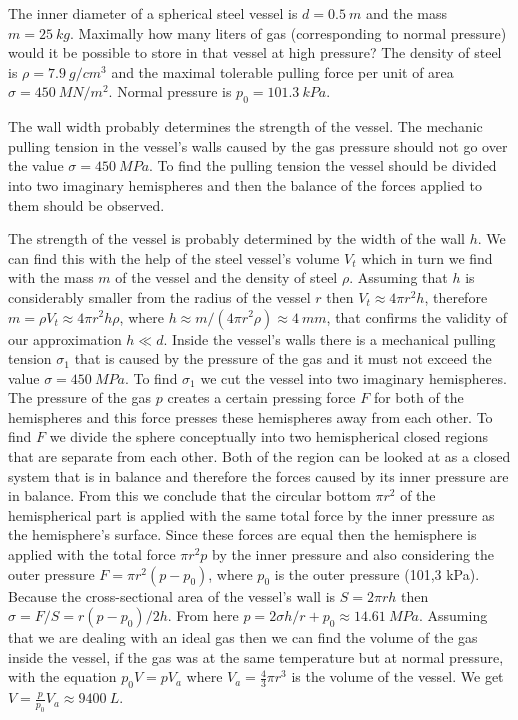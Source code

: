 {\ifEngStatement
The inner diameter of a spherical steel vessel is $d=\SI{0.5}{m}$ and the mass $m=\SI{25}{kg}$. Maximally how many liters of gas (corresponding to normal pressure) would it be possible to store in that vessel at high pressure? The density of steel is $\rho=\SI{7.9}{g/cm^3}$ and the maximal tolerable pulling force per unit of area $\sigma=\SI{450}{MN/m^2}$. Normal pressure is $p_0=\SI{101.3}{kPa}$.
\fi


\ifEngHint
The wall width probably determines the strength of the vessel. The mechanic pulling tension in the vessel's walls caused by the gas pressure should not go over the value $\sigma=\SI{450}{MPa}$. To find the pulling tension the vessel should be divided into two imaginary hemispheres and then the balance of the forces applied to them should be observed.
\fi


\ifEngSolution
The strength of the vessel is probably determined by the width of the wall $h$. We can find this with the help of the steel vessel’s volume $V_t$ which in turn we find with the mass $m$ of the vessel and the density of steel $\rho$. Assuming that $h$ is considerably smaller from the radius of the vessel $r$ then $V_t\approx4\pi r^2 h$, therefore $m=\rho V_t \approx 4\pi r^2h\rho$, where $h\approx m/(4\pi r^2\rho)\approx \SI{4}{mm}$, that confirms the validity of our approximation $h\ll d$. Inside the vessel’s walls there is a mechanical pulling tension $\sigma_1$ that is caused by the pressure of the gas and it must not exceed the value $\sigma=\SI{450}{MPa}$. To find $\sigma_1$ we cut the vessel into two imaginary hemispheres. The pressure of the gas $p$ creates a certain pressing force $F$ for both of the hemispheres and this force presses these hemispheres away from each other. To find $F$ we divide the sphere conceptually into two hemispherical closed regions that are separate from each other. Both of the region can be looked at as a closed system that is in balance and therefore the forces caused by its inner pressure are in balance. From this we conclude that the circular bottom $\pi r^2$ of the hemispherical part is applied with the same total force by the inner pressure as the hemisphere’s surface. Since these forces are equal then the hemisphere is applied with the total force $\pi r^2 p$ by the inner pressure and also considering the outer pressure $F=\pi r^2(p-p_0)$, where $p_0$ is the outer pressure (101,3 kPa). Because the cross-sectional area of the vessel’s wall is $S=2\pi rh$ then $\sigma=F/S=r(p-p_0)/2h$. From here $p=2\sigma h/r+p_0\approx \SI{14.61}{MPa}$. Assuming that we are dealing with an ideal gas then we can find the volume of the gas inside the vessel, if the gas was at the same temperature but at normal pressure, with the equation $p_0V=pV_a$ where $V_a=\frac{4}{3}\pi r^3$ is the volume of the vessel. We get $V=\frac{p}{p_0}V_a\approx\SI{9400}{L}$.
\fi
}